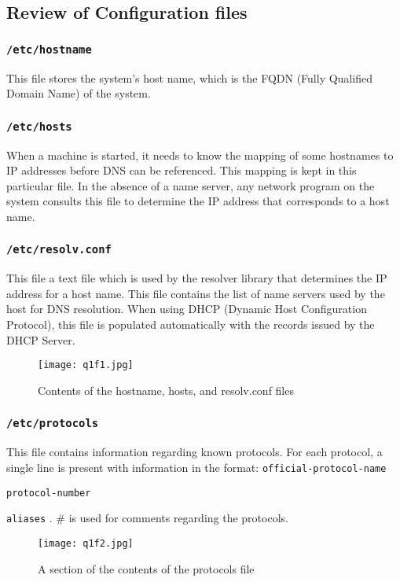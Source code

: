 \documentclass{article}
\let\oldtexttt\texttt
\renewcommand{\texttt}[1]{
  \colorbox{bgcolor}{\oldtexttt{#1}}
  }
\begin{document}
\subsection{Review of Configuration files}
\subsubsection{\texttt{/etc/hostname}}
This file stores the system's host name, which is the FQDN (Fully Qualified Domain Name) of the system.

\subsubsection{\texttt{/etc/hosts}}
When a machine is started, it needs to know the mapping of some hostnames to IP addresses before DNS can be referenced. This mapping is kept in this particular file. In the absence of a name server, any network program on the system consults this file to determine the IP address that corresponds to a host name.

\subsubsection{\texttt{/etc/resolv.conf}}
This file a text file which is used by the resolver library that determines the IP address for a host name. This file contains the list of name servers used by the host for DNS resolution. When using DHCP (Dynamic Host Configuration Protocol), this file is populated automatically with the records issued by the DHCP Server.

\begin{figure}[!hbt]
    \centering
    \texttt{[image: q1f1.jpg]}
    \caption{Contents of the hostname, hosts, and resolv.conf files}
    \label{fig:my_label1f1}
\end{figure}

\newpage
\subsubsection{\texttt{/etc/protocols}}
This file contains information regarding known protocols. For each protocol, a single line is present with information in the format: \texttt{official-protocol-name} \texttt{protocol-number} \texttt{aliases}. \# is used for comments regarding the protocols.
\begin{figure}[!hbt]
    \centering
    \texttt{[image: q1f2.jpg]}
    \caption{A section of the contents of the protocols file}
    \label{fig:my_label1f2}
\end{figure}
\end{document}
